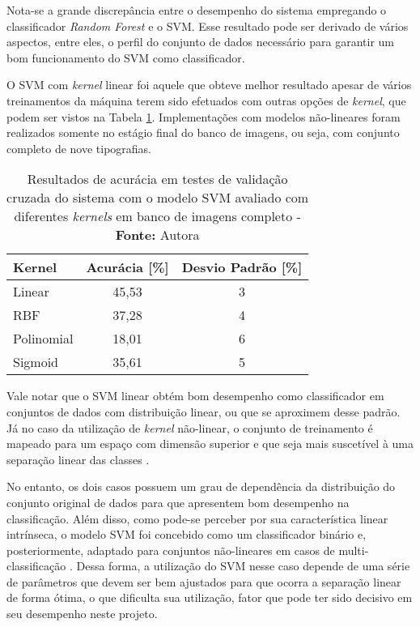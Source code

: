 Nota-se a grande discrepância entre o desempenho do sistema empregando o classificador \textit{Random Forest} e o SVM. Esse resultado pode ser derivado de vários aspectos, entre eles, o perfil do conjunto de dados necessário para garantir um bom funcionamento do SVM como classificador.

O SVM com \textit{kernel} linear foi aquele que obteve melhor resultado apesar de vários treinamentos da máquina terem sido efetuados com outras opções de \textit{kernel}, que podem ser vistos na Tabela \ref{tab:svmkernelResults}. Implementações com modelos não-lineares foram realizados somente no estágio final do banco de imagens, ou seja, com conjunto completo de nove tipografias.

\begin{table}[h]
 \centering
 \begin{tabular}{l|c|c}
    Kernel & Acurácia [\%] & Desvio Padrão [\%]\\
	\hline
	Linear &  45,53 & 3 \\
	RBF & 37,28 & 4 \\
	Polinomial & 18,01 & 6  \\
	Sigmoid & 35,61 & 5 \\
 \end{tabular}
 \caption{Resultados de acurácia em testes de validação cruzada do sistema com o modelo SVM avaliado com diferentes \textit{kernels} em banco de imagens completo - \textbf{Fonte:} Autora}
 \label{tab:svmkernelResults}
\end{table}

Vale notar que o SVM linear obtém bom desempenho como classificador em conjuntos de dados com distribuição linear, ou que se aproximem desse padrão. Já no caso da utilização de \textit{kernel} não-linear, o conjunto de treinamento é mapeado para um espaço com dimensão superior e que seja mais suscetível à uma separação linear das classes .

No entanto, os dois casos possuem um grau de dependência da distribuição do conjunto original de dados para que apresentem bom desempenho na classificação. Além disso, como pode-se perceber por sua característica linear intrínseca, o modelo SVM foi concebido como um classificador binário e, posteriormente, adaptado para conjuntos não-lineares em casos de multi-classificação . Dessa forma, a utilização do SVM nesse caso depende de uma série de parâmetros que devem ser bem ajustados para que ocorra a separação linear de forma ótima, o que dificulta sua utilização, fator que pode ter sido decisivo em seu desempenho neste projeto.

